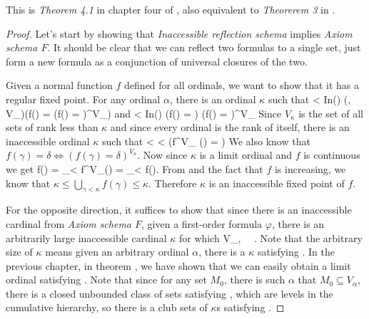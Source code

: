 This is \emph{Theorem 4.1} in chapter four of \cite{DrakeBook}, also equivalent to \emph{Theorerem 3} in \cite{Levy60a}.
\begin{proof}
Let's start by showing that \emph{Inaccessible reflection schema} implies \emph{Axiom schema $F$}. 
It should be clear that we can reflect two formulas to a single set, just form a new formula as a conjunction of universal closures of the two.

Given a normal function $f$ defined for all ordinals, we want to show that it has a regular fixed point. 
For any ordinal $\alpha$, there is an ordinal $\kappa$ such that 
\beq
\alpha < \kappa \et In(\kappa) \et (\forall \gamma, \delta \in V_\kappa)(f(\gamma) = \delta \iff (f(\gamma) = \delta)^{V_\kappa})
\eeq
and
\beq
\alpha < \kappa \et In(\kappa) \et \forall \gamma \exists \delta (f(\gamma) = \delta) \iff (\forall \gamma \exists \delta f(\gamma) = \delta)^{V_\kappa}
\eeq
Since $V_\kappa$ is the set of all sets of rank less than $\kappa$ and since every ordinal is the rank of itself, there is an inaccessible ordinal $\kappa$ such that
\beq
\forall \gamma < \kappa \exists \delta < \kappa (f^{V_\kappa} (\gamma) = \delta)\label{eq:reflected_function}
\eeq
We also know that $f(\gamma) = \delta \iff (f(\gamma) = \delta)^{V_\kappa}$. 
Now since $\kappa$ is a limit ordinal and $f$ is continuous we get
\beq
f(\kappa) = \bigcup_{\gamma < \kappa} f^{V_\kappa}(\gamma) = \bigcup_{\gamma < \kappa} f(\gamma)\mbox{.}
\eeq
From  and the fact that $f$ is increasing, we know that $\kappa \leq \bigcup_{\gamma < \kappa} f(\gamma) \leq \kappa$. Therefore $\kappa$ is an inaccessible fixed point of $f$.

For the opposite direction, it suffices to show that since there is an inaccessible cardinal from \emph{Axiom schema $F$}, given a first-order formula $\varphi$, there is an arbitrarily large inaccessible cardinal $\kappa$ for which 
\beq
\varphi \iff \langle V_\kappa, \in \rangle~\models~\varphi\mbox{.}\label{eq:ch3_f_iff_m_1}
\eeq
Note that the arbitrary size of $\kappa$ means given an arbitrary ordinal $\alpha$, there is a $\kappa$ satisfying .
In the previous chapter, in theorem , we have shown that we can easily obtain a limit ordinal satisfying . Note that since for any set $M_0$, there is such $\alpha$ that $M_0 \subseteq V_\alpha$, there is a closed unbounded class of sets satisfying , which are levels in the cumulative hierarchy, so there is a club sets of $\kappa$s satisfying .


\end{proof}
